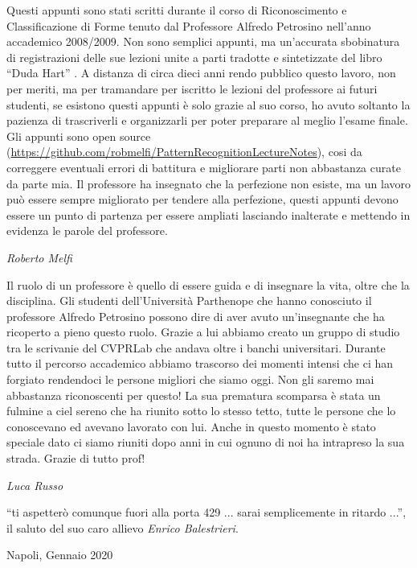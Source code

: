%
%
%

\preface

Questi appunti sono stati scritti durante il corso di Riconoscimento e Classificazione di Forme tenuto dal Professore Alfredo Petrosino nell’anno accademico 2008/2009. Non sono semplici appunti, ma un’accurata sbobinatura di registrazioni delle sue lezioni unite a parti tradotte e sintetizzate del libro “Duda Hart” \cite{duda}. 
A distanza di circa dieci anni rendo pubblico questo lavoro, non per meriti, ma per tramandare per iscritto le lezioni del professore ai futuri studenti, se esistono questi appunti è solo grazie al suo corso, ho avuto soltanto la pazienza di trascriverli e organizzarli per poter preparare al meglio l’esame finale. \\
Gli appunti sono open source (\url{https://github.com/robmelfi/PatternRecognitionLectureNotes}), cosi da correggere eventuali errori di battitura e migliorare parti non abbastanza curate da parte mia. 
Il professore ha insegnato che la perfezione non esiste, ma un lavoro può essere sempre migliorato per tendere alla perfezione, questi appunti devono essere un punto di partenza per essere ampliati lasciando inalterate e mettendo in evidenza le parole del professore. 




\begin{flushright}\noindent
\hfill {\it Roberto Melfi}\\
\end{flushright}
\vspace{0.5cm}

\noindent Il ruolo di un professore è quello di essere guida e di insegnare la vita, oltre che la disciplina.
Gli studenti dell’Università Parthenope che hanno conosciuto il professore Alfredo Petrosino possono dire di aver avuto un’insegnante che ha ricoperto a pieno questo ruolo.
Grazie a lui abbiamo creato un gruppo di studio tra le scrivanie del CVPRLab che andava oltre i banchi universitari.
Durante tutto il percorso accademico abbiamo trascorso dei momenti intensi che ci han forgiato rendendoci le persone migliori che siamo oggi. Non gli saremo mai abbastanza riconoscenti per questo!
La sua prematura scomparsa è stata un fulmine a ciel sereno che ha riunito sotto lo stesso tetto, tutte le persone che lo conoscevano ed avevano lavorato con lui. Anche in questo momento è stato speciale dato ci siamo riuniti dopo anni in cui ognuno di noi ha intrapreso la sua strada.
Grazie di tutto prof!\\

\begin{flushright}\noindent
\hfill {\it Luca Russo}\\
\end{flushright}
\vspace{0.5cm}
“ti aspetterò comunque fuori alla porta 429 ... sarai semplicemente in ritardo ...”, il saluto del suo caro allievo \emph{Enrico Balestrieri}.

\vspace{0.5cm}
Napoli, Gennaio 2020





